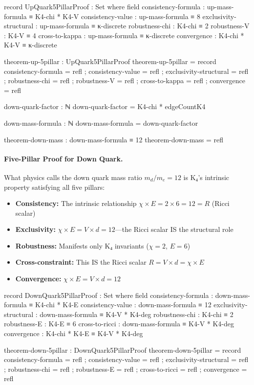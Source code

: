 \documentclass[11pt,a4paper]{book}
\begin{document}
\begin{code}
record UpQuark5PillarProof : Set where
  field
    consistency-formula : up-mass-formula ≡ K4-chi * K4-V
    consistency-value : up-mass-formula ≡ 8
    exclusivity-structural : up-mass-formula ≡ κ-discrete
    robustness-chi : K4-chi ≡ 2
    robustness-V : K4-V ≡ 4
    cross-to-kappa : up-mass-formula ≡ κ-discrete
    convergence : K4-chi * K4-V ≡ κ-discrete

theorem-up-5pillar : UpQuark5PillarProof
theorem-up-5pillar = record
  { consistency-formula = refl
  ; consistency-value = refl
  ; exclusivity-structural = refl
  ; robustness-chi = refl
  ; robustness-V = refl
  ; cross-to-kappa = refl
  ; convergence = refl
  }
\end{code}

\begin{code}
down-quark-factor : ℕ
down-quark-factor = K4-chi * edgeCountK4

down-mass-formula : ℕ
down-mass-formula = down-quark-factor

theorem-down-mass : down-mass-formula ≡ 12
theorem-down-mass = refl
\end{code}

\paragraph{Five-Pillar Proof for Down Quark.}
What physics calls the down quark mass ratio $m_d/m_e = 12$ is K₄'s intrinsic property satisfying all five pillars:
\begin{itemize}
\item \textbf{Consistency:} The intrinsic relationship $\chi \times E = 2 \times 6 = 12 = R$ (Ricci scalar)
\item \textbf{Exclusivity:} $\chi \times E = V \times d = 12$—the Ricci scalar IS the structural role
\item \textbf{Robustness:} Manifests only K₄ invariants ($\chi = 2$, $E = 6$)
\item \textbf{Cross-constraint:} This IS the Ricci scalar $R = V \times d = \chi \times E$
\item \textbf{Convergence:} $\chi \times E = V \times d = 12$
\end{itemize}

\begin{code}
record DownQuark5PillarProof : Set where
  field
    consistency-formula : down-mass-formula ≡ K4-chi * K4-E
    consistency-value : down-mass-formula ≡ 12
    exclusivity-structural : down-mass-formula ≡ K4-V * K4-deg
    robustness-chi : K4-chi ≡ 2
    robustness-E : K4-E ≡ 6
    cross-to-ricci : down-mass-formula ≡ K4-V * K4-deg
    convergence : K4-chi * K4-E ≡ K4-V * K4-deg

theorem-down-5pillar : DownQuark5PillarProof
theorem-down-5pillar = record
  { consistency-formula = refl
  ; consistency-value = refl
  ; exclusivity-structural = refl
  ; robustness-chi = refl
  ; robustness-E = refl
  ; cross-to-ricci = refl
  ; convergence = refl
  }
\end{code}
\end{document}
